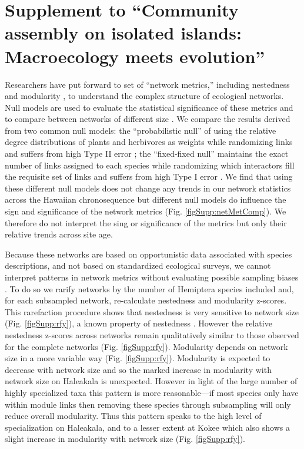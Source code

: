 \chapter{Supplement to ``Community assembly on isolated islands:
  Macroecology meets evolution''}
\label{supp:ch2}

Researchers have put forward to set of ``network metrics,'' including
nestedness \citep{bascompte2003, ulrich2009} and modularity
\citep{newman2004, olesen2007}, to understand the complex structure of
ecological networks. Null models are used to evaluate the statistical
significance of these metrics and to compare between networks of
different size \citep{ulrich2009}. We compare the results derived from
two common null models: the ``probabilistic null'' of
\cite{bascompte2003} using the relative degree distributions of plants
and herbivores as weights while randomizing links and suffers from
high Type II error \citep{ulrich2009}; the ``fixed-fixed null''
\citep{ulrich2009} maintains the exact number of links assigned to
each species while randomizing which interactors fill the requisite set
of links and suffers from high Type I error \citep{ulrich2009}. We find that
using these different null models does not change any trends in our
network statistics across the Hawaiian chronosequence but different
null models do influence the sign and significance of the network
metrics (Fig. \ref{figSupp:netMetComp}). We therefore do not interpret
the sing or significance of the metrics but only their relative trends
across site age.

Because these networks are based on opportunistic data associated with
species descriptions, and not based on standardized ecological
surveys, we cannot interpret patterns in network metrics without
evaluating possible sampling biases \citep{nielsen2007, gibson2011,
  rivera2012}.  To do so we rarify networks by the number of Hemiptera
species included and, for each subsampled network, re-calculate
nestedness and modularity z-scores. This rarefaction procedure shows
that nestedness is very sensitive to network size
(Fig. \ref{figSupp:rfy}), a known property of nestedness
\citep{nielsen2007, gibson2011, rivera2012}. However the relative
nestedness z-scores across networks remain qualitatively similar to
those observed for the complete networks (Fig. \ref{figSupp:rfy}).
Modularity depends on network size in a more variable way
(Fig. \ref{figSupp:rfy}). Modularity is expected to decrease with
network size \citep{rivera2012} and so the marked increase in
modularity with network size on Haleakala is unexpected. However in
light of the large number of highly specialized taxa this pattern is
more reasonable---if most species only have within module links then
removing these species through subsampling will only reduce overall
modularity.  Thus this pattern speaks to the high level of
specialization on Haleakala, and to a lesser extent at Kokee which
also shows a slight increase in modularity with network size
(Fig. \ref{figSupp:rfy}).

